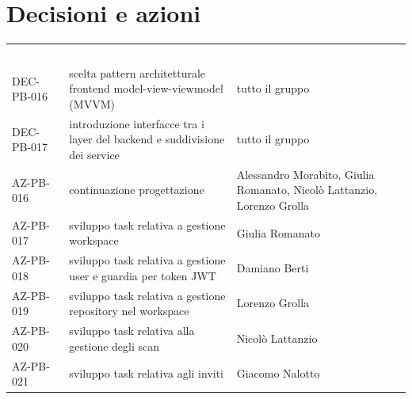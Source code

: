 \documentclass[a4paper, 11pt]{article}
\begin{document}
\section{Decisioni e azioni} \label{DecisioniAzioni}
\begin{center}
    \begin{tabular}{>{\centering\arraybackslash}m{3cm} >{\raggedright\arraybackslash}p{6cm} >{\centering\arraybackslash}p{3.5cm}}
        \rowcolor{AccentColor}
        \textcolor{white}{\textbf{Codice }} & 
        \multicolumn{1}{c}{\textcolor{white}{\textbf{Descrizione}}} & 
        \textcolor{white}{\textbf{Assegnatario}} \\
        DEC-PB-016 & scelta pattern architetturale frontend model-view-viewmodel (MVVM) & tutto il gruppo \\
        DEC-PB-017 & introduzione interfacce tra i layer del backend e suddivisione dei service & tutto il gruppo \\ 
        \midrule
        AZ-PB-016 & continuazione progettazione & Alessandro Morabito, Giulia Romanato, Nicolò Lattanzio, Lorenzo Grolla \\ 
        AZ-PB-017 & sviluppo task relativa a gestione workspace & Giulia Romanato \\
        AZ-PB-018 & sviluppo task relativa a gestione user e guardia per token JWT & Damiano Berti \\
        AZ-PB-019 & sviluppo task relativa a gestione repository nel workspace & Lorenzo Grolla \\
        AZ-PB-020 & sviluppo task relativa alla gestione degli  scan & Nicolò Lattanzio \\
        AZ-PB-021 & sviluppo task relativa agli inviti & Giacomo Nalotto \\
    \end{tabular}
\end{center}
\end{document}
